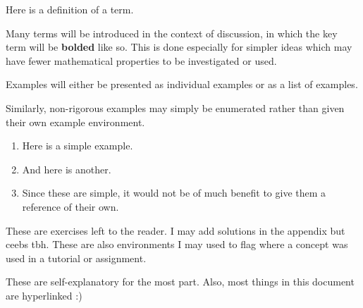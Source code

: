 \begin{definition}
    Here is a definition of a term. 
\end{definition}
Many terms will be introduced in the context of discussion, 
in which the key term will be \textbf{bolded} like so. 
This is done especially for simpler ideas which may have 
fewer mathematical properties to be investigated 
or used. 

\begin{example}
    Examples will either be presented as individual 
    examples or as a list of examples. 
\end{example}
Similarly, non-rigorous examples may simply be enumerated 
rather than given their own example environment. 
\begin{enumerate}
    \item Here is a simple example. 
    \item And here is another. 
    \item Since these are simple, it would not be 
    of much benefit to give them a reference of their own.
\end{enumerate}
\begin{exercise}
    These are exercises left to the reader. I may add solutions 
    in the appendix but ceebs tbh. These are also environments I may used to flag where a concept was used in a tutorial or assignment. 
\end{exercise}

These are self-explanatory for the most part. 
Also, most things in this document are hyperlinked :)
